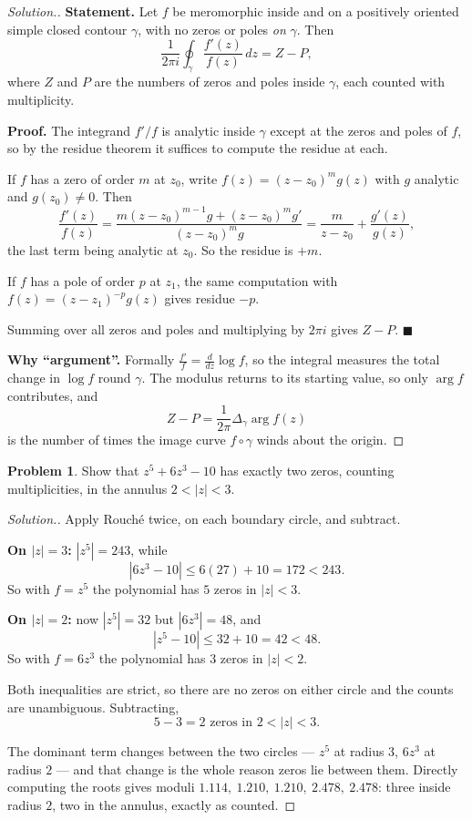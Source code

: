\documentclass[11pt,a4paper]{article}
\theoremstyle{definition}
\newtheorem{problemx}{Problem}[section]
\newenvironment{problem}{\begin{problemx}}{\end{problemx}}
\newenvironment{solution}
  {\renewcommand{\qedsymbol}{}\begin{proof}[\textit{Solution}.]}
  {\end{proof}}
\begin{document}
\begin{solution}
\textbf{Statement.} Let $f$ be meromorphic inside and on a positively oriented
simple closed contour $\gamma$, with no zeros or poles \emph{on} $\gamma$. Then
$$\frac{1}{2\pi i}\oint_{\gamma}\frac{f'(z)}{f(z)}\,dz = Z - P,$$
where $Z$ and $P$ are the numbers of zeros and poles inside $\gamma$, each counted
with multiplicity.

\textbf{Proof.} The integrand $f'/f$ is analytic inside $\gamma$ except at the
zeros and poles of $f$, so by the residue theorem it suffices to compute the
residue at each.

If $f$ has a zero of order $m$ at $z_0$, write $f(z) = (z-z_0)^{m}g(z)$ with $g$
analytic and $g(z_0) \neq 0$. Then
$$\frac{f'(z)}{f(z)}
= \frac{m(z-z_0)^{m-1}g + (z-z_0)^{m}g'}{(z-z_0)^{m}g}
= \frac{m}{z-z_0} + \frac{g'(z)}{g(z)},$$
the last term being analytic at $z_0$. So the residue is $+m$.

If $f$ has a pole of order $p$ at $z_1$, the same computation with
$f(z) = (z-z_1)^{-p}g(z)$ gives residue $-p$.

Summing over all zeros and poles and multiplying by $2\pi i$ gives $Z - P$.
$\blacksquare$

\textbf{Why ``argument''.} Formally $\frac{f'}{f} = \frac{d}{dz}\log f$, so the
integral measures the total change in $\log f$ round $\gamma$. The modulus returns
to its starting value, so only $\arg f$ contributes, and
$$Z - P = \frac{1}{2\pi}\Delta_{\gamma}\arg f(z)$$
is the number of times the image curve $f\circ\gamma$ winds about the origin.
\end{solution}


\begin{problem}
Show that $z^{5} + 6z^{3} - 10$ has exactly two zeros, counting multiplicities,
in the annulus $2 < \left|z\right| < 3$.
\end{problem}

\begin{solution}
Apply Rouch\'e twice, on each boundary circle, and subtract.

\textbf{On $\left|z\right| = 3$:} $\left|z^{5}\right| = 243$, while
$$\left|6z^{3} - 10\right| \leq 6(27) + 10 = 172 < 243 .$$
So with $f = z^{5}$ the polynomial has $5$ zeros in $\left|z\right| < 3$.

\textbf{On $\left|z\right| = 2$:} now $\left|z^{5}\right| = 32$ but
$\left|6z^{3}\right| = 48$, and
$$\left|z^{5} - 10\right| \leq 32 + 10 = 42 < 48 .$$
So with $f = 6z^{3}$ the polynomial has $3$ zeros in $\left|z\right| < 2$.

Both inequalities are strict, so there are no zeros on either circle and the
counts are unambiguous. Subtracting,
$$\boxed{5 - 3 = 2 \text{ zeros in } 2 < \left|z\right| < 3 .}$$

The dominant term changes between the two circles --- $z^{5}$ at radius $3$,
$6z^{3}$ at radius $2$ --- and that change is the whole reason zeros lie between
them. Directly computing the roots gives moduli
$1.114,\ 1.210,\ 1.210,\ 2.478,\ 2.478$: three inside radius $2$, two in the
annulus, exactly as counted.
\end{solution}
\end{document}
